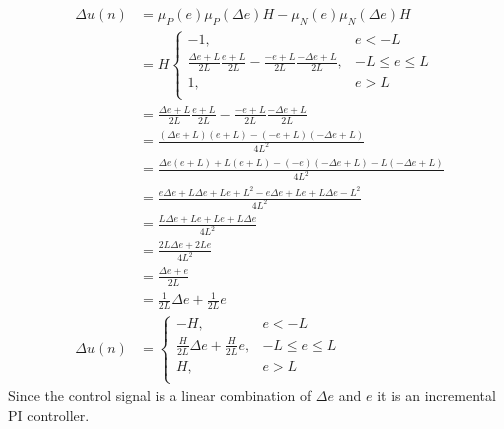 \begin{equation}
\begin{split}
    \Delta u(n)&=\mu_P(e) \mu_P (\Delta e)H-\mu_N(e) \mu_N (\Delta e)H\\
    &=H\begin{cases}
    -1,& e<-L\\
    \frac{\Delta e+L}{2L}\frac{e+L}{2L}-\frac{-e+L}{2L}\frac{-\Delta e+L}{2L},& -L\leq e\leq L\\
    1,& e>L\\
    \end{cases}\\
    &=\frac{\Delta e+L}{2L}\frac{e+L}{2L}-\frac{-e+L}{2L}\frac{-\Delta e+L}{2L}\\
    &=\frac{(\Delta e+L)(e+L)-(-e+L)(-\Delta e+L)}{4L^2}\\
    &=\frac{\Delta e(e+L)+L(e+L)-(-e)(-\Delta e+L)-L(-\Delta e+L)}{4L^2}\\
    &=\frac{e\Delta e+L\Delta e+Le+L^2-e\Delta e+Le+L\Delta e-L^2}{4L^2}\\
    &=\frac{L\Delta e+Le+Le+L\Delta e}{4L^2}\\
    &=\frac{2L\Delta e+2Le}{4L^2}\\
    &=\frac{\Delta e+e}{2L}\\
    &=\frac{1}{2L}\Delta e+\frac{1}{2L}e\\
    \Delta u(n)&=\begin{cases}
    -H,& e<-L\\
    \frac{H}{2L}\Delta e+\frac{H}{2L}e,& -L\leq e\leq L\\
    H,& e>L\\
    \end{cases}
\end{split}
\end{equation}
Since the control signal is a linear combination of $\Delta e$ and $e$ it is an incremental PI controller.




